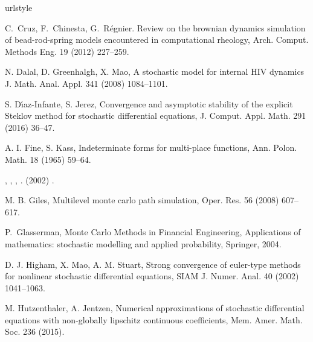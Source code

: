 \begin{thebibliography}{26}
\providecommand{\natexlab}[1]{#1}
\providecommand{\url}[1]{\texttt{#1}}
\expandafter\ifx\csname urlstyle\endcsname\relax
  \providecommand{\doi}[1]{doi: #1}\else
  \providecommand{\doi}{doi: \begingroup \urlstyle{rm}\Url}\fi

  
C.~Cruz, F.~Chinesta, G.~R\'{e}gnier.
\newblock Review on the brownian dynamics simulation of bead-rod-spring models
  encountered in computational rheology,
\newblock Arch. Comput. Methods Eng. 19 (2012) 227--259.

N. Dalal, D. Greenhalgh,  X. Mao,
\newblock A stochastic model for internal HIV dynamics
\newblock J. Math. Anal. Appl.
  341 (2008) 1084--1101.

S. D\'{\i}az-Infante, S. Jerez,
\newblock Convergence and asymptotic stability of the explicit Steklov method
  for stochastic differential equations,
\newblock J. Comput. Appl. Math. 291 (2016) 36--47.

A. I. Fine,  S. Kass,
\newblock Indeterminate forms for multi-place functions,
\newblock Ann. Polon. Math. 18 (1965) 59--64.

, ,
  , 
\newblock {}.
\newblock {}  (2002)
  .

M. B. Giles,
\newblock Multilevel monte carlo path simulation,
\newblock Oper. Res. 56 (2008) 607--617.

P.~Glasserman,
\newblock Monte Carlo Methods in Financial Engineering,
\newblock Applications of mathematics: stochastic modelling and applied
  probability, Springer, 2004.
  

D. J. Higham, X. Mao,  A. M. Stuart,
\newblock Strong convergence of euler-type methods for nonlinear stochastic
  differential equations,
\newblock  SIAM J. Numer. Anal. 40  (2002)  1041--1063.


M. Hutzenthaler, A. Jentzen, 
\newblock Numerical approximations of stochastic differential equations with
  non-globally lipschitz continuous coefficients,
\newblock Mem. Amer. Math. Soc. 236 (2015).



\end{thebibliography}
